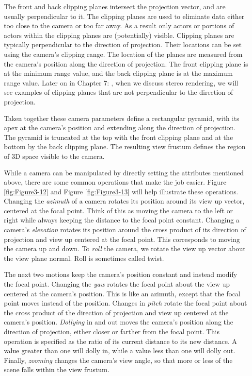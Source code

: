 The front and back clipping planes intersect the projection vector, and are usually perpendicular to it. The clipping planes are used to eliminate data either too close to the camera or too far away. As a result only actors or portions of actors within the clipping planes are (potentially) visible. Clipping planes are typically perpendicular to the direction of projection. Their locations can be set using the camera's clipping range. The location of the planes are measured from the camera's position along the direction of projection. The front clipping plane is at the minimum range value, and the back clipping plane is at the maximum range value. Later on in Chapter 7: , when we discuss stereo rendering, we will see examples of clipping planes that are not perpendicular to the direction of projection.

Taken together these camera parameters define a rectangular pyramid, with its apex at the camera's position and extending along the direction of projection. The pyramid is truncated at the top with the front clipping plane and at the bottom by the back clipping plane. The resulting view frustum defines the region of 3D space visible to the camera.

While a camera can be manipulated by directly setting the attributes mentioned above, there are some common operations that make the job easier. Figure \ref{fig:Figure3-12} and Figure \ref{fig:Figure3-13} will help illustrate these operations. Changing the \emph{azimuth} of a camera rotates its position around its view up vector, centered at the focal point. Think of this as moving the camera to the left or right while always keeping the distance to the focal point constant. Changing a camera's \emph{elevation} rotates its position around the cross product of its direction of projection and view up centered at the focal point. This corresponds to moving the camera up and down. To \emph{roll} the camera, we rotate the view up vector about the view plane normal. Roll is sometimes called twist.

The next two motions keep the camera's position constant and instead modify the focal point. Changing the \emph{yaw} rotates the focal point about the view up centered at the camera's position. This is like an azimuth, except that the focal point moves instead of the position. Changes in \emph{pitch} rotate the focal point about the cross product of the direction of projection and view up centered at the camera's position. \emph{Dollying} in and out moves the camera's position along the direction of projection, either closer or farther from the focal point. This operation is specified as the ratio of its current distance to its new distance. A value greater than one will dolly in, while a value less than one will dolly out. Finally, \emph{zooming} changes the camera's view angle, so that more or less of the scene falls within the view frustum.

